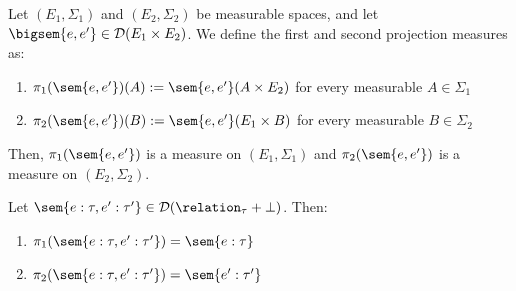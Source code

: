 \begin{definition}
	Let $(E_1, \Sigma_1)$ and $(E_2, \Sigma_2)$ be measurable spaces, and let $\bigsem{e,e'} \in \mathcal{D}(E_1 \times E_2)$. We define the first and second projection measures as:
	\begin{enumerate}
		\item $\pi_1(\sem{e,e'})(A) := \sem{e,e'}(A \times E_2)$ for every measurable $A \in \Sigma_1$
		\item $\pi_2(\sem{e,e'})(B) := \sem{e,e'}(E_1 \times B)$ for every measurable $B \in \Sigma_2$
	\end{enumerate}
	Then, $\pi_1(\sem{e,e'})$ is a measure on $(E_1, \Sigma_1)$ and $\pi_2(\sem{e,e'})$ is a measure on $(E_2, \Sigma_2)$.
\end{definition}

\begin{lemma}\label{lem:small-step-proj}
	Let $\sem{e : \tau, e' : \tau'} \in \mathcal{D}(\relation_{\tau} + \bot)$. Then:
	\begin{enumerate}
		\item $\pi_1(\sem{e : \tau, e' : \tau'}) = \sem{e : \tau}$
		\item $\pi_2(\sem{e : \tau, e' : \tau'}) = \sem{e' : \tau'}$
	\end{enumerate}
\end{lemma}

